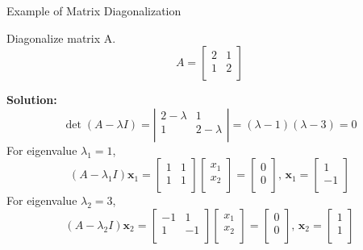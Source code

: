 \documentclass{beamer}
\begin{document}
\begin{frame}{Example of Matrix Diagonalization}
\begin{examples}
Diagonalize matrix A.
\begin{equation*}
    A=\left[ \begin{matrix}
	2&		1\\
	1&		2\\
\end{matrix} \right]
\end{equation*}
\end{examples}
\textbf{Solution:}
\begin{equation*}
    \det \left( A-\lambda I \right) =\left| \begin{matrix}
	2-\lambda&		1\\
	1&		2-\lambda\\
\end{matrix} \right|=\left( \lambda -1 \right) \left( \lambda -3 \right) =0
\end{equation*}
For eigenvalue $\lambda_1=1$,
\begin{equation*}
    \left( A-\lambda_1 I \right) \mathbf{x}_1=\left[ \begin{matrix}
	1&		1\\
	1&		1\\
\end{matrix} \right] \left[ \begin{array}{c}
	x_1\\
	x_2\\
\end{array} \right] =\left[ \begin{array}{c}
	0\\
	0\\
\end{array} \right] , \, \mathbf{x}_1=\left[ \begin{array}{c}
	1\\
	-1\\
\end{array} \right]
\end{equation*}
For eigenvalue $\lambda_2=3$,
\begin{equation*}
    \left( A-\lambda_2 I \right) \mathbf{x}_2=\left[ \begin{matrix}
	-1&		1\\
	1&		-1\\
\end{matrix} \right] \left[ \begin{array}{c}
	x_1\\
	x_2\\
\end{array} \right] =\left[ \begin{array}{c}
	0\\
	0\\
\end{array} \right] , \, \mathbf{x}_2=\left[ \begin{array}{c}
	1\\
	1\\
\end{array} \right]
\end{equation*}



\end{frame}
\end{document}
